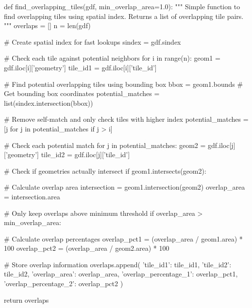 \begin{code}[H]
    \begin{pythoncode}
    def find_overlapping_tiles(gdf, min_overlap_area=1.0):
        """
        Simple function to find overlapping tiles using spatial index.
        Returns a list of overlapping tile pairs.
        """
        overlaps = []
        n = len(gdf)
        
        # Create spatial index for fast lookups
        sindex = gdf.sindex
        
        # Check each tile against potential neighbors
        for i in range(n):
            geom1 = gdf.iloc[i]['geometry']
            tile_id1 = gdf.iloc[i]['tile_id']
            
            # Find potential overlapping tiles using bounding box
            bbox = geom1.bounds  # Get bounding box coordinates
            potential_matches = list(sindex.intersection(bbox))
            
            # Remove self-match and only check tiles with higher index
            potential_matches = [j for j in potential_matches if j > i]
            
            # Check each potential match
            for j in potential_matches:
                geom2 = gdf.iloc[j]['geometry']
                tile_id2 = gdf.iloc[j]['tile_id']
                
                # Check if geometries actually intersect
                if geom1.intersects(geom2):
                    
                    # Calculate overlap area
                    intersection = geom1.intersection(geom2)
                    overlap_area = intersection.area
                    
                    # Only keep overlaps above minimum threshold
                    if overlap_area > min_overlap_area:
                        
                        # Calculate overlap percentages
                        overlap_pct1 = (overlap_area / geom1.area) * 100
                        overlap_pct2 = (overlap_area / geom2.area) * 100
                        
                        # Store overlap information
                        overlaps.append({
                            'tile_id1': tile_id1,
                            'tile_id2': tile_id2,
                            'overlap_area': overlap_area,
                            'overlap_percentage_1': overlap_pct1,
                            'overlap_percentage_2': overlap_pct2
                        })
        
        return overlaps
    \end{pythoncode}
    \label{code:post_traitement_detection_tuile_chevauchement}
\end{code}

